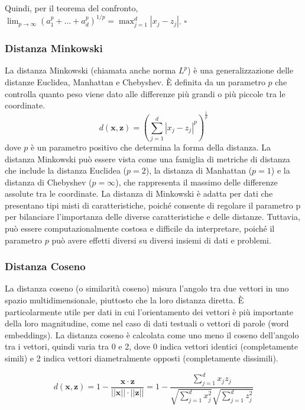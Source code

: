     Quindi, per il teorema del confronto, $\lim_{p \to \infty} (a^p_1 + \ldots + a^p_d)^{1/p} = \max_{j=1}^d |x_j - z_j|$. $\square$

\subsubsection{Distanza Minkowski} La distanza Minkowski (chiamata anche norma $L^p$) è
    una generalizzazione delle distanze Euclidea, Manhattan e Chebyshev. 
    È definita da un parametro $p$ che controlla quanto peso viene dato alle differenze più 
    grandi o più piccole tra le coordinate.
    \[
    d(\mathbf{x}, \mathbf{z}) = \left( \sum_{j=1}^d |x_j - z_j|^p \right)^{\frac{1}{p}}
    \]
    dove \( p \) è un parametro positivo che determina la forma della distanza. La distanza 
    Minkowski può essere vista come una famiglia di metriche di distanza che include la 
    distanza Euclidea ($p = 2$), la distanza di Manhattan ($p = 1$) e la distanza di 
    Chebyshev ($p = \infty$), che rappresenta il massimo delle differenze assolute 
    tra le coordinate. La distanza di Minkowski è adatta per dati che presentano tipi misti 
    di caratteristiche, poiché consente di regolare il parametro p per bilanciare 
    l'importanza delle diverse caratteristiche e delle distanze. Tuttavia, può essere 
    computazionalmente costosa e difficile da interpretare, poiché il parametro $p$ può 
    avere effetti diversi su diversi insiemi di dati e problemi.

\subsubsection{Distanza Coseno} La distanza coseno (o similarità coseno) misura 
    l'angolo tra due vettori in uno spazio multidimensionale, piuttosto che la loro distanza diretta. 
    È particolarmente utile per dati in cui l'orientamento dei vettori è più importante della loro 
    magnitudine, come nel caso di dati testuali o vettori di parole (word embeddings). La distanza 
    coseno è calcolata come uno meno il coseno dell'angolo tra i vettori, quindi varia tra 0 e 2, 
    dove 0 indica vettori identici (completamente simili) e 2 indica vettori diametralmente opposti 
    (completamente dissimili).

    \[
d(\mathbf{x}, \mathbf{z}) = 1 - \frac{\mathbf{x} \cdot \mathbf{z}}{||\mathbf{x}|| \cdot ||\mathbf{z}||} = 1 - \frac{\sum_{j=1}^d x_j z_j}{\sqrt{\sum_{j=1}^d x_j^2} \sqrt{\sum_{j=1}^d z_j^2}}
\]

